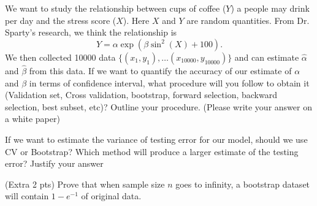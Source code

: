 \documentclass[11pt,answers,addpoints]{exam}
\begin{document}
\begin{questions}
\newpage
	
	


\question[10] We want to study the relationship between cups of coffee ($Y$) a people may drink per day and the stress score ($X$). Here $X$ and $Y$ are
random quantities. From Dr. Sparty's research, we think the relationship is $$Y = \alpha \exp(\beta \sin^2 (X) + 100).$$ We then collected 10000 data $\{(x_1, y_1), \ldots (x_{10000}, y_{10000}) \}$ and can estimate $\hat{\alpha}$ and $\hat{\beta}$ from this data. If we want to quantify the accuracy of our estimate of $\alpha$ and $\beta$ in terms of confidence interval, what procedure will you follow to obtain it (Validation set, Cross validation, bootstrap, forward selection, backward selection, best subset, etc)? Outline your procedure. (Please write your answer on a white paper)
\vspace{2in}

\question[5] If we want to estimate the variance of testing error for our model, should we use CV or Bootstrap? Which method will produce a larger estimate of the testing error? Justify your answer

\vspace{1 in}

\question (Extra 2 pts) Prove that when sample size $n$ goes to infinity,  a bootstrap dataset will contain $1 - e^{-1}$  of original data. 

\end{questions}
\end{document}
